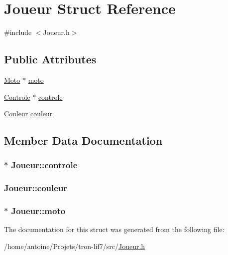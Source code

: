 \hypertarget{structJoueur}{\section{Joueur Struct Reference}
\label{structJoueur}
}


{\ttfamily \#include $<$Joueur.\-h$>$}

\subsection*{Public Attributes}
\begin{DoxyCompactItemize}
\item 
\hyperlink{structMoto}{Moto} $\ast$ \hyperlink{structJoueur_a24e0bf8a7b0d6e2e322fb9bb6483b887}{moto}
\item 
\hyperlink{structControle}{Controle} $\ast$ \hyperlink{structJoueur_ab412dfbe4ccd49dd5e436f425c1522bc}{controle}
\item 
\hyperlink{Couleur_8h_aa304d0ca681f782b1d7735da33037dd7}{Couleur} \hyperlink{structJoueur_a966bbda4413e0b0d7aaf109660926639}{couleur}
\end{DoxyCompactItemize}


\subsection{Member Data Documentation}
\hypertarget{structJoueur_ab412dfbe4ccd49dd5e436f425c1522bc}{
\subsubsection[{controle}]{$\ast$ Joueur\-::controle}}\label{structJoueur_ab412dfbe4ccd49dd5e436f425c1522bc}
\hypertarget{structJoueur_a966bbda4413e0b0d7aaf109660926639}{
\subsubsection[{couleur}]{ Joueur\-::couleur}}\label{structJoueur_a966bbda4413e0b0d7aaf109660926639}
\hypertarget{structJoueur_a24e0bf8a7b0d6e2e322fb9bb6483b887}{
\subsubsection[{moto}]{$\ast$ Joueur\-::moto}}\label{structJoueur_a24e0bf8a7b0d6e2e322fb9bb6483b887}


The documentation for this struct was generated from the following file\-:\begin{DoxyCompactItemize}
\item 
/home/antoine/\-Projets/tron-\/lif7/src/\hyperlink{Joueur_8h}{Joueur.\-h}\end{DoxyCompactItemize}
